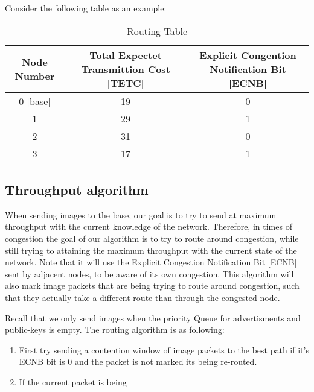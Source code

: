 \documentclass[letterpaper]{article}
\begin{document}
Consider the following table as an example:

\begin{table}[ht]
\caption{Routing Table} %
\centering %
\begin{tabular}{c c c} %
\hline
\hline %
Node Number & Total Expectet Transmittion Cost [TETC] & Explicit Congention Notification Bit [ECNB]  \\[0.5ex] %
\hline %
0 [base] & 19 & 0\\
1 & 29 & 1\\
2 & 31 & 0 \\
3 & 17 & 1\\ [1ex]
\hline
\end{tabular}
\label{table:nonlin}
\end{table}

\subsection{Throughput algorithm}

When sending images to the base, our goal is to try to send at maximum throughput with the current knowledge of the network. Therefore, in times of congestion the goal of our algorithm is to try to route around congestion, while still trying to attaining the maximum throughput with the current state of the network. Note that it will use the Explicit Congestion Notification Bit [ECNB] sent by adjacent nodes, to be aware of its own congestion. This algorithm will also mark image packets that are being trying to route around congestion, such that they actually take a different route than through the congested node.

Recall that we only send images when the priority Queue for advertisments and public-keys is empty. The routing algorithm is as following:

\begin{enumerate}
  \item First try sending a contention window of image packets to the best path if it's ECNB bit is 0 and the packet is not marked its being re-routed.
  \item If the current packet is being 
\end{enumerate}
\end{document}

